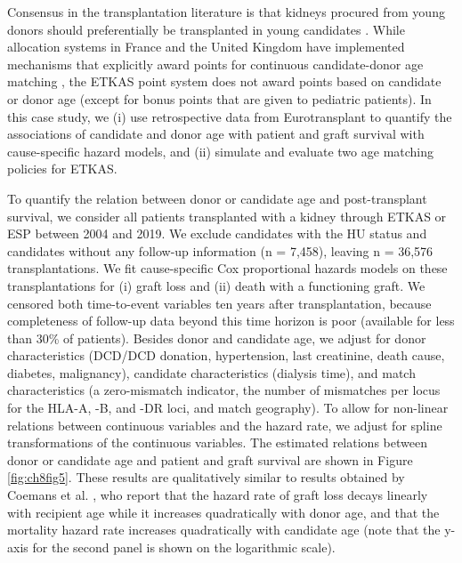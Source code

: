 \documentclass[11pt,twoside,]{book}
\begin{document}
Consensus in the transplantation literature is that kidneys procured
from young donors should preferentially be transplanted in young
candidates
\citep{waiserAgeMatchingRenal2000, pippiasYoungDeceasedDonor2020, vanittersumIncreasedRiskGraft2017, coemansCompetingRisksModel2024, keithEffectDonorRecipient2004b}.
While allocation systems in France and the United Kingdom have implemented mechanisms that explicitly award points for
continuous candidate-donor age matching
\citep{Audry2022, watson2020overview}, the
ETKAS point system does not award points based on candidate or donor age
(except for bonus points that are given to pediatric patients). In this case study, we (i) use retrospective data
from Eurotransplant to quantify the associations of candidate and donor age with patient and graft survival
with cause-specific
hazard models, and (ii) simulate and evaluate two age matching policies
for ETKAS.

To quantify the relation between donor or candidate age and
post-transplant survival, we consider all patients transplanted with a
kidney through ETKAS or ESP between 2004 and 2019. We exclude candidates
with the HU status and candidates without any follow-up information
(n = 7,458), leaving n = 36,576 transplantations. We fit
cause-specific Cox proportional hazards models on these transplantations
for (i) graft loss and (ii) death with a functioning graft. We censored
both time-to-event variables ten years after transplantation, because
completeness of follow-up data beyond this time
horizon is poor (available for less than 30\% of patients). Besides donor and candidate age, we adjust for
donor characteristics (DCD/DCD donation, hypertension,
last creatinine, death cause, diabetes, malignancy), candidate
characteristics (dialysis time), and match characteristics (a zero-mismatch
indicator, the number of mismatches per locus for the HLA-A, -B, and -DR loci, and
match geography). To allow for non-linear relations between continuous
variables and the hazard rate, we adjust for spline transformations of
the continuous variables. The estimated relations between donor or
candidate age and patient and graft survival are shown in Figure \ref{fig:ch8fig5}. These results are qualitatively
similar to results obtained by Coemans et al. \citep{coemansCompetingRisksModel2024},
who report that the hazard rate of graft loss decays linearly with
recipient age while it increases quadratically with donor age, and that
the mortality hazard rate increases quadratically with candidate age (note that the y-axis for the second panel is shown on the logarithmic scale).
\end{document}
